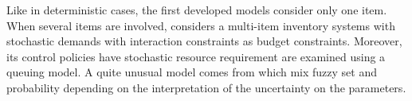 \medskip


Like in deterministic cases, the first developed models consider only one item.
When several items are involved, \cite{Daeschner1975} considers a multi-item inventory systems with stochastic demands with interaction constraints as budget constraints.
Moreover, its control policies have stochastic resource requirement are examined using a queuing model.
A quite unusual model comes from \cite{Panda2008} which mix fuzzy set and probability depending on the interpretation of the uncertainty on the parameters.


























